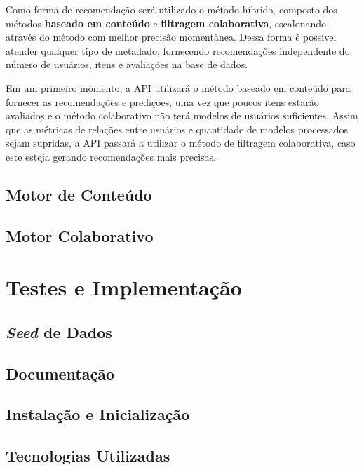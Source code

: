 \documentclass[12pt, openright, oneside, a4paper, brazil]{abntex2}
\begin{document}
Como forma de recomendação será utilizado o método híbrido, composto dos métodos \textbf{baseado em conteúdo} e \textbf{filtragem colaborativa}, escalonando através do método com melhor precisão momentânea. Dessa forma é possível atender qualquer tipo de metadado, fornecendo recomendações independente do número de usuários, itens e avaliações na base de dados.

Em um primeiro momento, a API utilizará o método baseado em conteúdo para fornecer as recomendações e predições, uma vez que poucos itens estarão avaliados e o método colaborativo não terá modelos de usuários suficientes. Assim que as métricas de relações entre usuários e quantidade de modelos processados sejam supridas, a API passará a utilizar o método de filtragem colaborativa, caso este esteja gerando recomendações mais precisas.

\subsection{Motor de Conteúdo} \label{motor:conteudo}

\subsection{Motor Colaborativo} \label{motor:colaborativo}

\section{Testes e Implementação} \label{testes}

\subsection{\textit{Seed} de Dados}

\subsection{Documentação}

\subsection{Instalação e Inicialização}



\subsection{Tecnologias Utilizadas} \label{tecnologias}
\end{document}
